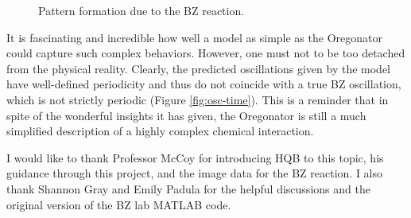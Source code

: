 \documentclass[twocolumn,amsmath,amssymb,aps]{revtex4}
\begin{document}
\begin{figure}[!htb]
	\centering
	\vspace{+15pt}
	\caption{Pattern formation due to the BZ reaction.}
	\label{fig:Pattern}
\end{figure}


It is fascinating and incredible how well a model as simple as the Oregonator could capture such complex behaviors. However, one must not to be too detached from the physical reality. Clearly, the predicted oscillations given by the model have well-defined periodicity and thus do not coincide with a true BZ oscillation, which is not strictly periodic (Figure \ref{fig:osc-time}). This is a reminder that in spite of the wonderful insights it has given, the Oregonator is still a much simplified description of a highly complex chemical interaction. 


\begin{acknowledgments}
I would like to thank Professor McCoy for introducing HQB to this topic, his guidance through this project, and the image data for the BZ reaction. I also thank Shannon Gray and Emily Padula for the helpful discussions and the original version of the BZ lab MATLAB code.  
\end{acknowledgments}



\end{document}
